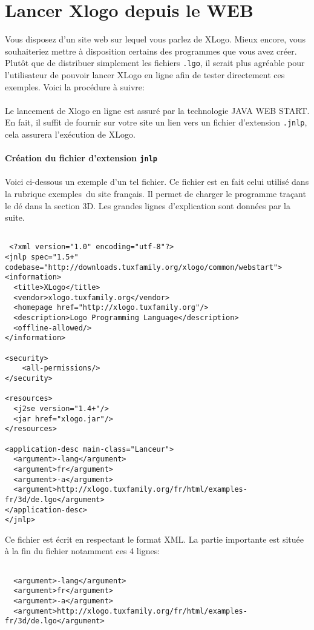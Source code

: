 \chapter{Lancer Xlogo depuis le WEB}
\noindent
Vous disposez d'un site web sur lequel vous parlez de XLogo. Mieux encore, vous souhaiteriez mettre à disposition certains des programmes que vous avez créer. Plutôt que de distribuer simplement les fichiers \texttt{.lgo}, il serait plus agréable pour l'utilisateur de pouvoir lancer XLogo en ligne afin de tester directement ces exemples. Voici la procédure à suivre:\\ \\
Le lancement de Xlogo en ligne est assuré par la technologie \textsc{JAVA WEB START}. En fait, il suffit de fournir sur votre site un lien vers un fichier d'extension \texttt{.jnlp}, cela assurera l'exécution de XLogo.\\ \\
\textbf{Création du fichier d'extension \texttt{jnlp}}\\ \\
Voici ci-dessous un exemple d'un tel fichier. Ce fichier est en fait celui utilisé dans la rubrique \og exemples\fg\ du site français. Il permet de charger le programme traçant le dé dans la section 3D. Les grandes lignes d'explication sont données par la suite.
\begin{verbatim}

 <?xml version="1.0" encoding="utf-8"?>
<jnlp spec="1.5+" codebase="http://downloads.tuxfamily.org/xlogo/common/webstart">
<information>
  <title>XLogo</title>
  <vendor>xlogo.tuxfamily.org</vendor>
  <homepage href="http://xlogo.tuxfamily.org"/>
  <description>Logo Programming Language</description>
  <offline-allowed/>
</information>

<security>
	<all-permissions/>
</security>

<resources>
  <j2se version="1.4+"/>
  <jar href="xlogo.jar"/>
</resources>

<application-desc main-class="Lanceur">
  <argument>-lang</argument>
  <argument>fr</argument>
  <argument>-a</argument>
  <argument>http://xlogo.tuxfamily.org/fr/html/examples-fr/3d/de.lgo</argument>
</application-desc>
</jnlp>

\end{verbatim}
Ce fichier est écrit en respectant le format XML. La partie importante est située à la fin du fichier notamment ces 4 lignes:
\begin{verbatim}

  <argument>-lang</argument>
  <argument>fr</argument>
  <argument>-a</argument>
  <argument>http://xlogo.tuxfamily.org/fr/html/examples-fr/3d/de.lgo</argument>

\end{verbatim}
